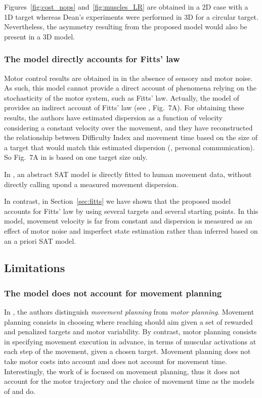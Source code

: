 \documentclass[10pt]{article}
\begin{document}
Figures~\ref{fig:cost_nops} and~\ref{fig:muscles_LR} are obtained in a 2D case with a 1D target whereas Dean's experiments were performed in 3D for a circular target. Nevertheless, the asymmetry resulting from the proposed model would also be present in a 3D model. 


\subsubsection{The model directly accounts for Fitts' law}
\label{sec:discu_fitts}
Motor control results are obtained in \cite{rigoux12} in the absence of sensory and motor noise. As such, this model cannot provide a direct account of phenomena relying on the stochasticity of the motor system, such as Fitts' law. Actually, the model of \cite{rigoux12} provides an indirect account of Fitts' law (see \cite{rigoux12}, Fig.~7A). For obtaining these results, the authors have estimated dispersion as a function of velocity considering a constant velocity over the movement, and they have reconstructed the relationship between Difficulty Index and movement time based on the size of a target that would match this estimated dispersion (\cite{rigoux12}, personal communication). So Fig.~7A in \cite{rigoux12} is based on one target size only.

In \cite{Dean2007}, an abstract SAT model is directly fitted to human movement data, without directly calling upond a measured movement dispersion.

In contrast, in Section~\ref{sec:fitts} we have shown that the proposed model accounts for Fitts' law by using several targets and several starting points. In this model, movement velocity is far from constant and dispersion is measured as an effect of motor noise and imperfect state estimation rather than inferred based on an a priori SAT model.

\subsection{Limitations}

\subsubsection{The model does not account for movement planning}
\label{sec:limitations}

In \cite{Trommershauser2003a,Trommershauser2005}, the authors distinguish {\em movement planning} from {\em motor planning}. Movement planning consists in choosing where reaching should aim given a set of rewarded and penalized targets and motor variability. By contrast, motor planning consists in specifying movement execution in advance, in terms of muscular activations at each step of the movement, given a chosen target. Movement planning does not take motor costs into account and does not account for movement time.
Interestingly, the work of \cite{Trommershauser2003a,Trommershauser2005} is focused on movement planning, thus it does not account for the motor trajectory and the choice of movement time as the models of \cite{shadmehr10} and \cite{rigoux12} do.
\end{document}
